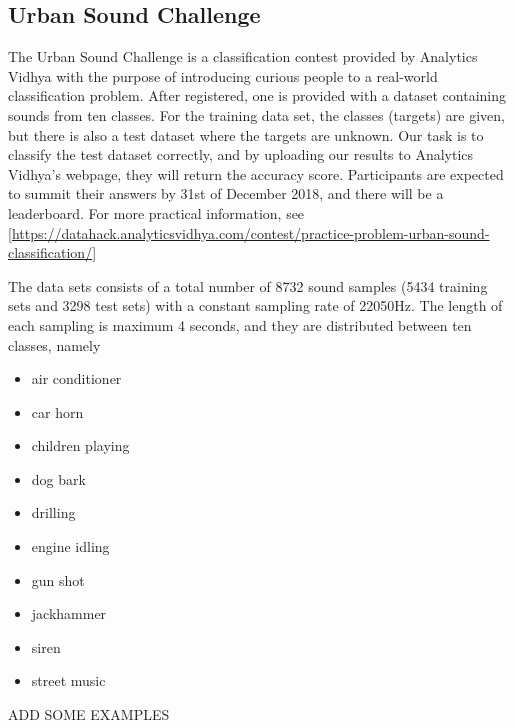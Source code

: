 \subsection{Urban Sound Challenge}
The Urban Sound Challenge is a classification contest provided by Analytics Vidhya with the purpose of introducing curious people to a real-world classification problem. After registered, one is provided with a dataset containing sounds from ten classes. For the training data set, the classes (targets) are given, but there is also a test dataset where the targets are unknown. Our task is to classify the test dataset correctly, and by uploading our results to Analytics Vidhya's webpage, they will return the accuracy score. Participants are expected to summit their answers by 31st of December 2018, and there will be a leaderboard. For more practical information, see [\url{https://datahack.analyticsvidhya.com/contest/practice-problem-urban-sound-classification/}]

The data sets consists of a total number of 8732 sound samples (5434 training sets and 3298 test sets) with a constant sampling rate of 22050Hz. The length of each sampling is maximum 4 seconds, and they are distributed between ten classes, namely
\begin{multicols}{2}
\begin{itemize}
	\setlength\itemsep{0.2em}
	\item air conditioner
	\item car horn
	\item children playing
	\item dog bark
	\item drilling
\end{itemize}

\columnbreak

\begin{itemize}
	\setlength\itemsep{0.2em}
	\item engine idling
	\item gun shot
	\item jackhammer
	\item siren
	\item street music
\end{itemize}
\end{multicols}

ADD SOME EXAMPLES